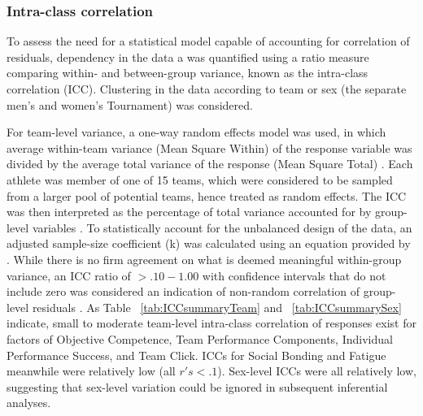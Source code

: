 {\subsubsection{Intra-class correlation}
To assess the need for a statistical model capable of accounting for correlation of residuals, dependency in the data a was quantified using a ratio measure comparing within- and between-group variance, known as the intra-class correlation (ICC). Clustering in the data according to team or sex (the separate men's and women's Tournament) was considered.

For team-level variance, a one-way random effects model was used, in which average within-team variance (Mean Square Within) of the response variable was divided by the average total variance of the response (Mean Square Total) \citep{Field2005a}.  Each athlete was member of one of 15 teams, which were considered to be sampled from a larger pool of potential teams, hence treated as random effects. The ICC was then interpreted as the percentage of total variance accounted for by group-level variables \citep{Wolak2012}.
To statistically account for the unbalanced design of the data, an adjusted sample-size coefficient (k) was calculated using an equation provided by \citep{Lessells1987}.  While there is no firm agreement on what is deemed meaningful within-group variance, an ICC ratio of $>.10-1.00$ with confidence intervals that do not include zero was considered an indication of non-random correlation of group-level residuals \citep{Bailey2011}. As Table ~\ref{tab:ICCsummaryTeam} and ~\ref{tab:ICCsummarySex} indicate, small to moderate team-level intra-class correlation of responses exist for factors of Objective Competence, Team Performance Components, Individual Performance Success, and Team Click.  ICCs for Social Bonding and Fatigue meanwhile were relatively low (all $r's <.1$). Sex-level ICCs were all relatively low, suggesting that sex-level variation could be ignored in subsequent inferential analyses.\\



}
